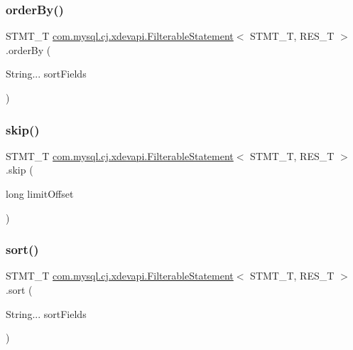 \subsubsection{\texorpdfstring{order\+By()}{orderBy()}}
{\footnotesize\ttfamily S\+T\+M\+T\+\_\+T \mbox{\hyperlink{classcom_1_1mysql_1_1cj_1_1xdevapi_1_1_filterable_statement}{com.\+mysql.\+cj.\+xdevapi.\+Filterable\+Statement}}$<$ S\+T\+M\+T\+\_\+T, R\+E\+S\+\_\+T $>$.order\+By (\begin{DoxyParamCaption}\item[{String...}]{sort\+Fields }\end{DoxyParamCaption})}

\mbox{\label{classcom_1_1mysql_1_1cj_1_1xdevapi_1_1_filterable_statement_ac3e56b485f1b7ec38f0d3d57313b0e3d}} 
\subsubsection{\texorpdfstring{skip()}{skip()}}
{\footnotesize\ttfamily S\+T\+M\+T\+\_\+T \mbox{\hyperlink{classcom_1_1mysql_1_1cj_1_1xdevapi_1_1_filterable_statement}{com.\+mysql.\+cj.\+xdevapi.\+Filterable\+Statement}}$<$ S\+T\+M\+T\+\_\+T, R\+E\+S\+\_\+T $>$.skip (\begin{DoxyParamCaption}\item[{long}]{limit\+Offset }\end{DoxyParamCaption})}

\mbox{\label{classcom_1_1mysql_1_1cj_1_1xdevapi_1_1_filterable_statement_ad2f31a6534645c0b82b1c71693ddd8f6}} 
\subsubsection{\texorpdfstring{sort()}{sort()}}
{\footnotesize\ttfamily S\+T\+M\+T\+\_\+T \mbox{\hyperlink{classcom_1_1mysql_1_1cj_1_1xdevapi_1_1_filterable_statement}{com.\+mysql.\+cj.\+xdevapi.\+Filterable\+Statement}}$<$ S\+T\+M\+T\+\_\+T, R\+E\+S\+\_\+T $>$.sort (\begin{DoxyParamCaption}\item[{String...}]{sort\+Fields }\end{DoxyParamCaption})}

